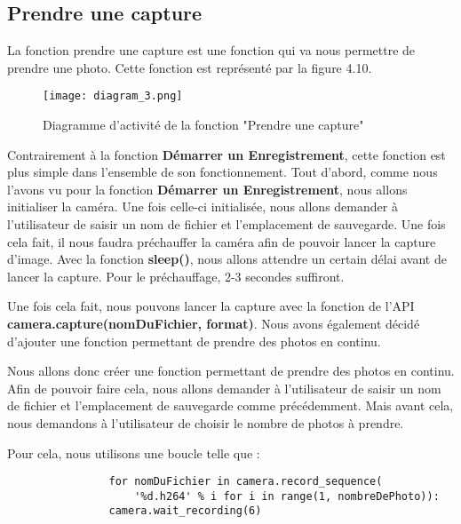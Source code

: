         \subsection{Prendre une capture}
        La fonction prendre une capture est une fonction qui va nous permettre de prendre une photo.
        Cette fonction est représenté par la figure 4.10.
        \begin{figure}[ht]
            \centering
            \texttt{[image: diagram\_3.png]} 
            \caption{Diagramme d'activité de la fonction "Prendre une capture"}
        \end{figure}

        Contrairement à la fonction \textbf{Démarrer un Enregistrement}, cette fonction est plus simple dans l'ensemble de son fonctionnement. Tout d'abord, comme nous l'avons vu pour la fonction \textbf{Démarrer un Enregistrement}, nous allons initialiser la caméra. Une fois celle-ci initialisée, nous allons demander à l'utilisateur de saisir un nom de fichier et l'emplacement de sauvegarde. Une fois cela fait, il nous faudra préchauffer la caméra afin de pouvoir lancer la capture d'image. Avec la fonction \textbf{sleep()}, nous allons attendre un certain délai avant de lancer la capture.
        Pour le préchauffage, 2-3 secondes suffiront.

        \vspace{0.2cm}

        Une fois cela fait, nous pouvons lancer la capture avec la fonction de l'API \textbf{camera.capture(nomDuFichier, format)}. Nous avons également décidé d'ajouter une fonction permettant de prendre des photos en continu.

        \vspace{0.2cm}

        Nous allons donc créer une fonction permettant de prendre des photos en continu.
        Afin de pouvoir faire cela, nous allons demander à l'utilisateur de saisir un nom de fichier et l'emplacement de sauvegarde comme précédemment.
        Mais avant cela, nous demandons à l'utilisateur de choisir le nombre de photos à prendre.

        \vspace{0.5cm}

        \begin{flushleft}
            Pour cela, nous utilisons une boucle telle que : 
            \begin{verbatim}
                for nomDuFichier in camera.record_sequence(
                    '%d.h264' % i for i in range(1, nombreDePhoto)):
                camera.wait_recording(6)
            \end{verbatim}            
        \end{flushleft}

